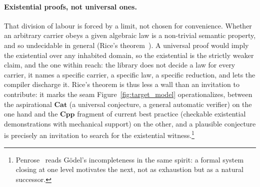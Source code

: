 \documentclass[11pt, a4paper]{article}
\begin{document}
\paragraph{Existential proofs, not universal ones.}
That division of labour is forced by a limit, not chosen for convenience.
Whether an arbitrary carrier obeys a given algebraic law is a non-trivial semantic property, and so undecidable in general (Rice's theorem~\cite{rice1953classes}).
A universal proof would imply the existential over any inhabited domain, so the existential is the strictly weaker claim, and the one within reach: the library does not decide a law for every carrier, it names a specific carrier, a specific law, a specific reduction, and lets the compiler discharge it.
Rice's theorem is thus less a wall than an invitation to contribute: it marks the seam Figure~\ref{fig:target_model} operationalizes, between the aspirational $\mathbf{Cat}$ (a universal conjecture, a general automatic verifier) on the one hand and the $\mathbf{Cpp}$ fragment of current best practice (checkable existential demonstrations with mechanical support) on the other, and a plausible conjecture is precisely an invitation to search for the existential witness.\footnote{Penrose~\cite{penrose2004roadtoreality} reads G\"odel's incompleteness in the same spirit: a formal system closing at one level motivates the next, not as exhaustion but as a natural successor.}
\end{document}
